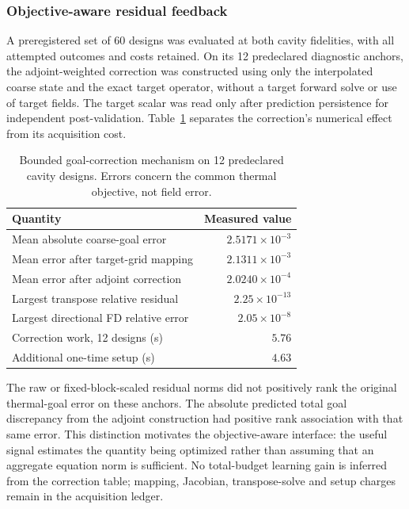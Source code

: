 \subsubsection{Objective-aware residual feedback}
A preregistered set of 60 designs was evaluated at both cavity fidelities, with all attempted outcomes and costs retained. On its 12 predeclared diagnostic anchors, the adjoint-weighted correction was constructed using only the interpolated coarse state and the exact target operator, without a target forward solve or use of target fields. The target scalar was read only after prediction persistence for independent post-validation. Table~\ref{tab:goal-correction} separates the correction's numerical effect from its acquisition cost.
\begin{table}[t]
\centering
\caption{Bounded goal-correction mechanism on 12 predeclared cavity designs. Errors concern the common thermal objective, not field error.}
\label{tab:goal-correction}
\begin{tabular}{lr}
\toprule
Quantity & Measured value \\
\midrule
Mean absolute coarse-goal error & $2.5171\times10^{-3}$ \\
Mean error after target-grid mapping & $2.1311\times10^{-3}$ \\
Mean error after adjoint correction & $2.0240\times10^{-4}$ \\
Largest transpose relative residual & $2.25\times10^{-13}$ \\
Largest directional FD relative error & $2.05\times10^{-8}$ \\
Correction work, 12 designs (s) & $5.76$ \\
Additional one-time setup (s) & $4.63$ \\
\bottomrule
\end{tabular}
\end{table}
The raw or fixed-block-scaled residual norms did not positively rank the original thermal-goal error on these anchors. The absolute predicted total goal discrepancy from the adjoint construction had positive rank association with that same error. This distinction motivates the objective-aware interface: the useful signal estimates the quantity being optimized rather than assuming that an aggregate equation norm is sufficient. No total-budget learning gain is inferred from the correction table; mapping, Jacobian, transpose-solve and setup charges remain in the acquisition ledger.


